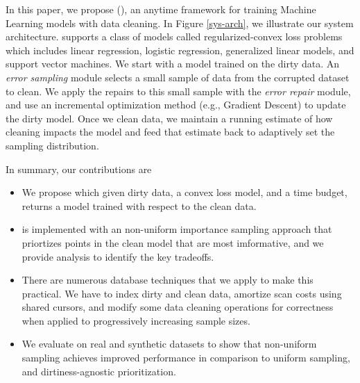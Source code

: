 In this paper, we propose \sysfull (\sys), an anytime framework for training Machine Learning models with data cleaning.
In Figure \ref{sys-arch}, we illustrate our system architecture.
\sys supports a class of models called regularized-convex loss problems which includes linear regression, logistic regression, generalized linear models, and support vector machines.
We start with a model trained on the dirty data.
An \emph{error sampling} module selects a small sample of data from the corrupted dataset to clean.
We apply the repairs to this small sample with the \emph{error repair} module, and use an incremental optimization method (e.g., Gradient Descent) to update the dirty model.
Once we clean data, we maintain a running estimate of how cleaning impacts the model and feed that estimate back to adaptively set the sampling distribution.

In summary, our contributions are
\begin{itemize}[noitemsep]
\item We propose \sysfull which given dirty data, a convex loss model, and a time budget, returns a model trained with respect to the clean data.
\item \sysfull is implemented with an non-uniform importance sampling approach that priortizes points in the clean model that are most imformative, and we provide analysis to identify the key tradeoffs.
\item There are numerous database techniques that we apply to make this practical. We have to index dirty and clean data, amortize scan costs using shared cursors, and modify some data cleaning operations for correctness when applied to progressively increasing sample sizes.
\item We evaluate \sysfull on real and synthetic datasets to show that non-uniform sampling achieves improved performance in comparison to uniform sampling, and dirtiness-agnostic prioritization.
\end{itemize}








